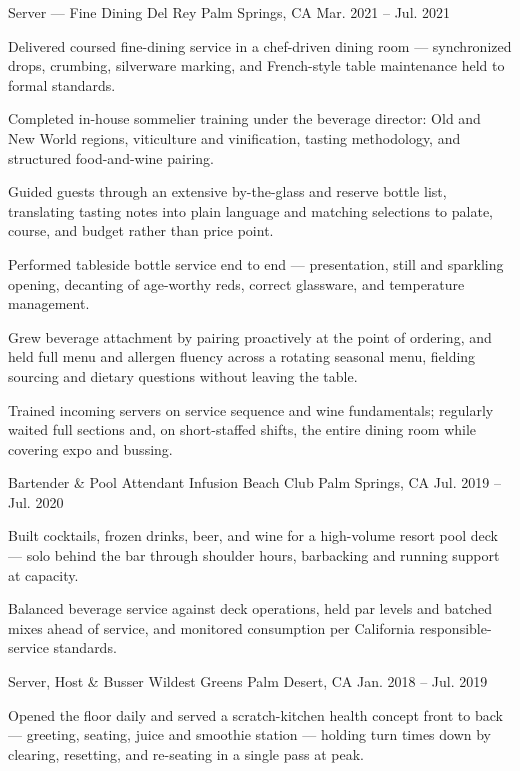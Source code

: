 \documentclass[10pt, letterpaper]{awesome-cv}
\begin{document}
\begin{cventries}
  \cventry
    {Server --- Fine Dining}
    {Del Rey}
    {Palm Springs, CA}
    {Mar. 2021 -- Jul. 2021}
    {
      \begin{cvitems}
        \item {Delivered coursed fine-dining service in a chef-driven dining room --- synchronized drops, crumbing, silverware marking, and French-style table maintenance held to formal standards.}
        \item {Completed in-house sommelier training under the beverage director: Old and New World regions, viticulture and vinification, tasting methodology, and structured food-and-wine pairing.}
        \item {Guided guests through an extensive by-the-glass and reserve bottle list, translating tasting notes into plain language and matching selections to palate, course, and budget rather than price point.}
        \item {Performed tableside bottle service end to end --- presentation, still and sparkling opening, decanting of age-worthy reds, correct glassware, and temperature management.}
        \item {Grew beverage attachment by pairing proactively at the point of ordering, and held full menu and allergen fluency across a rotating seasonal menu, fielding sourcing and dietary questions without leaving the table.}
        \item {Trained incoming servers on service sequence and wine fundamentals; regularly waited full sections and, on short-staffed shifts, the entire dining room while covering expo and bussing.}
      \end{cvitems}
    }

  \cventry
    {Bartender \& Pool Attendant}
    {Infusion Beach Club}
    {Palm Springs, CA}
    {Jul. 2019 -- Jul. 2020}
    {
      \begin{cvitems}
        \item {Built cocktails, frozen drinks, beer, and wine for a high-volume resort pool deck --- solo behind the bar through shoulder hours, barbacking and running support at capacity.}
        \item {Balanced beverage service against deck operations, held par levels and batched mixes ahead of service, and monitored consumption per California responsible-service standards.}
      \end{cvitems}
    }

  \cventry
    {Server, Host \& Busser}
    {Wildest Greens}
    {Palm Desert, CA}
    {Jan. 2018 -- Jul. 2019}
    {
      \begin{cvitems}
        \item {Opened the floor daily and served a scratch-kitchen health concept front to back --- greeting, seating, juice and smoothie station --- holding turn times down by clearing, resetting, and re-seating in a single pass at peak.}
      \end{cvitems}
    }

\end{cventries}
\end{document}
